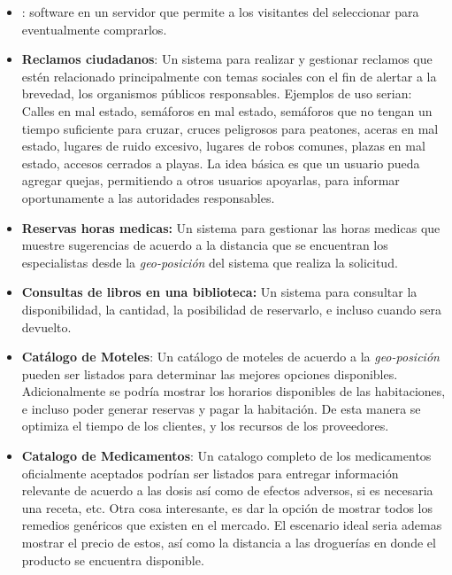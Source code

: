 \begin{itemize}
	\item \textbf{\shoppingcart}: \ecommerce software en un servidor \web que permite a los visitantes del \website seleccionar \itemscommerce para eventualmente comprarlos.
	
	\item \textbf{Reclamos ciudadanos}: Un sistema para realizar y gestionar reclamos que estén relacionado principalmente con temas sociales con el fin de alertar a la brevedad, los organismos públicos responsables. Ejemplos de uso serian: Calles en mal estado, semáforos en mal estado, semáforos que no tengan un tiempo suficiente para cruzar, cruces peligrosos para peatones, aceras en mal estado, lugares de ruido excesivo, lugares de robos comunes, plazas en mal estado, accesos cerrados a playas. La idea básica es que un usuario pueda agregar quejas, permitiendo a otros usuarios apoyarlas, para informar oportunamente a las autoridades responsables.
	
	\item \textbf{Reservas horas medicas:} Un sistema para gestionar las horas medicas que muestre sugerencias de acuerdo a la distancia que se encuentran los especialistas desde la \textit{geo-posición} del sistema que realiza la solicitud. 
	
	\item \textbf{Consultas de libros en una biblioteca:} Un sistema para consultar la disponibilidad, la cantidad, la posibilidad de reservarlo, e incluso cuando sera devuelto.
	\item \textbf{Catálogo de Moteles}: Un catálogo de moteles de acuerdo a la \textit{geo-posición} pueden ser listados para determinar las mejores opciones disponibles. Adicionalmente se podría mostrar los horarios disponibles de las habitaciones, e incluso poder generar reservas y pagar la habitación. De esta manera se optimiza el tiempo de los clientes, y los recursos de los proveedores.
	
	\item \textbf{Catalogo de Medicamentos}: Un catalogo completo de los medicamentos oficialmente aceptados podrían ser listados para entregar información relevante de acuerdo a las dosis así como de efectos adversos, si es necesaria una receta, etc. Otra cosa interesante, es dar la opción de mostrar todos los remedios genéricos que existen en el mercado. El escenario ideal seria ademas mostrar el precio de estos, así como la distancia a las droguerías en donde el producto se encuentra disponible.
	

\end{itemize}
